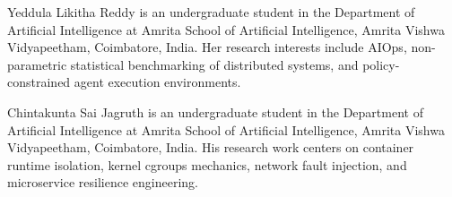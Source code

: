 \documentclass[journal,10pt,twoside]{IEEEtran}
\begin{document}
\begin{IEEEbiographynophoto}{Yeddula Likitha Reddy}
is an undergraduate student in the Department of Artificial Intelligence at Amrita School of Artificial Intelligence, Amrita Vishwa Vidyapeetham, Coimbatore, India. Her research interests include AIOps, non-parametric statistical benchmarking of distributed systems, and policy-constrained agent execution environments.
\end{IEEEbiographynophoto}

\begin{IEEEbiographynophoto}{Chintakunta Sai Jagruth}
is an undergraduate student in the Department of Artificial Intelligence at Amrita School of Artificial Intelligence, Amrita Vishwa Vidyapeetham, Coimbatore, India. His research work centers on container runtime isolation, kernel cgroups mechanics, network fault injection, and microservice resilience engineering.
\end{IEEEbiographynophoto}
\end{document}

